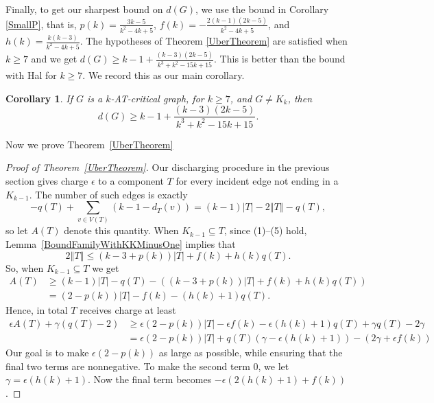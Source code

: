 \documentclass[12pt]{article}
\theoremstyle{plain}
\newtheorem{cor}[thm]{Corollary}
\theoremstyle{definition}
\theoremstyle{remark}
\newcommand{\set}[1]{\left\{ #1 \right\}}
\newcommand{\card}[1]{\left|#1\right|}
\newcommand{\size}[1]{\left\Vert#1\right\Vert}
\newcommand{\parens}[1]{\left( #1 \right)}
\begin{document}
Finally, to get our sharpest bound on $d(G)$, we use the bound in Corollary \ref{SmallP}, that is, $p(k) = \frac{3k-5}{k^2 - 4k + 5}$, $f(k) = -\frac{2(k-1)(2k-5)}{k^2 - 4k + 5}$, and $h(k) = \frac{k(k-3)}{k^2 - 4k + 5}$.  The hypotheses of Theorem \ref{UberTheorem} are satisfied when $k\ge7$ and we get $d(G) \ge k-1 + \frac{(k-3)(2k-5)}{k^3 + k^2 - 15k + 15}.$
 This is better than the bound with Hal for $k \ge 7$.  We record this as our main corollary.

\begin{cor}\label{mainCor}
If $G$ is a $k$-AT-critical graph, for $k\ge 7$, and $G\ne K_k$, then
 \[d(G) \ge k-1 + \frac{(k-3)(2k-5)}{k^3 + k^2 - 15k + 15}.\]
\end{cor}

Now we prove Theorem~\ref{UberTheorem}
\begin{proof}[Proof of Theorem~\ref{UberTheorem}]
Our discharging procedure in the previous section gives charge $\epsilon$ to a component $T$ for every incident edge not ending in a $K_{k-1}$.  The number of such edges is exactly
\[-q(T) + \sum_{v \in V(T)} (k-1 - d_T(v)) = (k-1)\card{T} - 2\size{T} - q(T),\]
so let $A(T)$ denote this quantity.  When $K_{k-1} \subseteq T$, since (1)--(5) hold, Lemma~\ref{BoundFamilyWithKKMinusOne} implies that
\[2\size{T} \le (k-3 + p(k))\card{T} + f(k) + h(k)q(T).\]
So, when $K_{k-1} \subseteq T$ we get
\begin{align*}
    A(T) & \ge (k-1)\card{T} - q(T) - ((k-3 + p(k))\card{T} + f(k) + h(k)q(T))\\
         &  =(2-p(k))\card{T} - f(k) - (h(k) + 1)q(T).
\end{align*}
Hence, in total $T$ receives charge at least
\begin{align*}
    \epsilon A(T) + \gamma(q(T) - 2) &\ge \epsilon(2-p(k))|T| - \epsilon f(k) - \epsilon (h(k)+1)q(T) +\gamma q(T)-2\gamma \\
    & = \epsilon(2-p(k))|T| + q(T)(\gamma - \epsilon (h(k)+1)) - (2\gamma + \epsilon f(k))
\end{align*}
Our goal is to make $\epsilon(2-p(k))$ as large as possible, while ensuring that the final two terms are nonnegative.  To make the second term 0, we let $\gamma = \epsilon(h(k) + 1)$.  Now the final term becomes $-\epsilon(2(h(k)+1)+f(k))$.
%

\end{proof}
\end{document}
